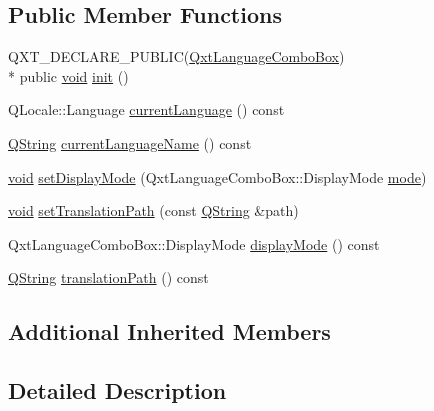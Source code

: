 \subsection*{Public Member Functions}
\begin{DoxyCompactItemize}
\item 
Q\-X\-T\-\_\-\-D\-E\-C\-L\-A\-R\-E\-\_\-\-P\-U\-B\-L\-I\-C(\hyperlink{class_qxt_language_combo_box}{Qxt\-Language\-Combo\-Box}) \\*
public \hyperlink{group___u_a_v_objects_plugin_ga444cf2ff3f0ecbe028adce838d373f5c}{void} \hyperlink{class_qxt_language_combo_box_private_a0aea27c953aba7441ae614f5d897b188}{init} ()
\item 
Q\-Locale\-::\-Language \hyperlink{class_qxt_language_combo_box_private_a5c3c94ffc81bcea47a1146d12604c681}{current\-Language} () const 
\item 
\hyperlink{group___u_a_v_objects_plugin_gab9d252f49c333c94a72f97ce3105a32d}{Q\-String} \hyperlink{class_qxt_language_combo_box_private_af1e6956273d3b76ffe3694cf96d1c471}{current\-Language\-Name} () const 
\item 
\hyperlink{group___u_a_v_objects_plugin_ga444cf2ff3f0ecbe028adce838d373f5c}{void} \hyperlink{class_qxt_language_combo_box_private_abe3506d5d3c02daf400c2f92a5ee48a1}{set\-Display\-Mode} (Qxt\-Language\-Combo\-Box\-::\-Display\-Mode \hyperlink{glext_8h_a1e71d9c196e4683cc06c4b54d53f7ef5}{mode})
\item 
\hyperlink{group___u_a_v_objects_plugin_ga444cf2ff3f0ecbe028adce838d373f5c}{void} \hyperlink{class_qxt_language_combo_box_private_abb43b7fbe0c9849b1395bea304c70c20}{set\-Translation\-Path} (const \hyperlink{group___u_a_v_objects_plugin_gab9d252f49c333c94a72f97ce3105a32d}{Q\-String} \&path)
\item 
Qxt\-Language\-Combo\-Box\-::\-Display\-Mode \hyperlink{class_qxt_language_combo_box_private_a949c6c027578b2ee59939cb69d0cc6fe}{display\-Mode} () const 
\item 
\hyperlink{group___u_a_v_objects_plugin_gab9d252f49c333c94a72f97ce3105a32d}{Q\-String} \hyperlink{class_qxt_language_combo_box_private_aa72649f6c3d0afea6c4989573d1c7b75}{translation\-Path} () const 
\end{DoxyCompactItemize}
\subsection*{Additional Inherited Members}


\subsection{Detailed Description}


